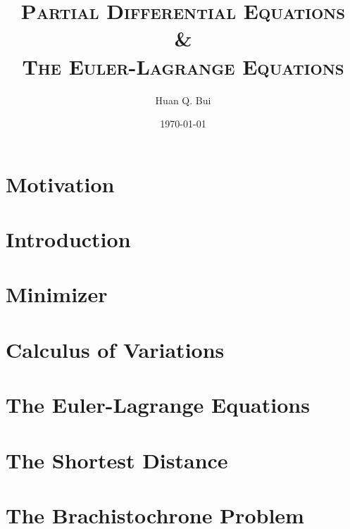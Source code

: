 \documentclass{article}
\theoremstyle{definition}
\begin{document}
	
	\begin{titlepage}\centering
		\clearpage
		\title{\textsc{\bf{Partial Differential Equations \\ \& \\ The Euler-Lagrange Equations}}}
		\author{\bigskip Huan Q. Bui}
		\date{\today}
		\maketitle
		\thispagestyle{empty}
	\end{titlepage}


	\tableofcontents
	
	
	
\section{Motivation}


\section{Introduction}

\section{Minimizer}

\section{Calculus of Variations}

\section{The Euler-Lagrange Equations}

\section{The Shortest Distance}

\section{The Brachistochrone Problem}
\end{document}
